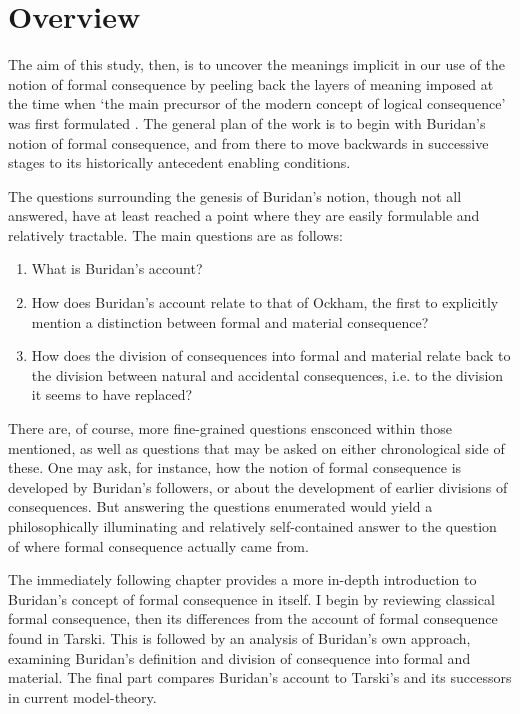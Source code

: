 			
			\section{Overview}
			The aim of this study, then, is to uncover the meanings implicit in our use of the notion of formal consequence by peeling back the layers of meaning imposed at the time when `the main precursor of the modern concept of logical consequence' was first formulated \cite{DutilhNovaes2012a}. The general plan of the work is to begin with Buridan's notion of formal consequence, and from there to move backwards in successive stages to its historically antecedent enabling conditions. 
			
			The questions surrounding the genesis of Buridan's notion, though not all answered, have at least reached a point where they are easily formulable and relatively tractable. The main questions are as follows: 
			\begin{enumerate}
				\item What is Buridan's account?
				\item How does Buridan's account relate to that of Ockham, the first to explicitly mention a distinction between formal and material consequence?
				\item How does the division of consequences into formal and material relate back to the division between natural and accidental consequences, i.e. to the division it seems to have replaced?
			\end{enumerate}
			There are, of course, more fine-grained questions ensconced within those mentioned, as well as questions that may be asked on either chronological side of these. One may ask, for instance, how the notion of formal consequence is developed by Buridan's followers, or about the development of earlier divisions of consequences. But answering the questions enumerated would yield a philosophically illuminating and relatively self-contained answer to the question of where formal consequence actually came from.
			
			The immediately following chapter provides a more in-depth introduction to Buridan's concept of formal consequence in itself. I begin by reviewing classical formal consequence, then its differences from the account of formal consequence found in Tarski. This is followed by an analysis of Buridan's own approach, examining Buridan's definition and division of consequence into formal and material. The final part compares Buridan's account to Tarski's and its successors in current model-theory. 
			
